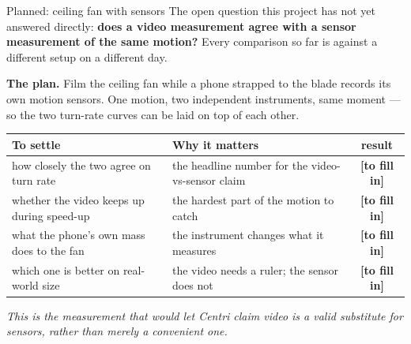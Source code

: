 \documentclass[aspectratio=169,10pt]{beamer}
\newcommand{\todo}{{\scriptsize\color{cAccent}\textbf{[to fill in]}}}
\newcommand{\takeaway}[1]{\vfill{\footnotesize\itshape\color{cGrey}#1\par}}
\begin{document}
\begin{frame}{Planned: ceiling fan with sensors}
\small
The open question this project has not yet answered directly: \textbf{does a video measurement agree
with a sensor measurement of the same motion?} Every comparison so far is against a different setup
on a different day.
\vspace{0.3em}

\begin{tcolorbox}[colback=cPed!6,colframe=cPed,boxsep=1pt,left=6pt,right=6pt,top=2pt,bottom=2pt]
\small \textbf{The plan.} Film the ceiling fan while a phone strapped to the blade records its own
motion sensors. One motion, two independent instruments, same moment --- so the two turn-rate curves
can be laid on top of each other.
\end{tcolorbox}
\vspace{0.3em}

\scriptsize
\renewcommand{\arraystretch}{1.35}
\begin{tabular}{@{}p{5.3cm}p{5.6cm}c@{}}
\toprule
\textbf{To settle} & \textbf{Why it matters} & \textbf{result} \\
\midrule
how closely the two agree on turn rate & the headline number for the video-vs-sensor claim & \todo \\
whether the video keeps up during speed-up & the hardest part of the motion to catch & \todo \\
what the phone's own mass does to the fan & the instrument changes what it measures & \todo \\
which one is better on real-world size & the video needs a ruler; the sensor does not & \todo \\
\bottomrule
\end{tabular}
\takeaway{This is the measurement that would let Centri claim video is a valid substitute for sensors,
rather than merely a convenient one.}
\end{frame}
\end{document}

